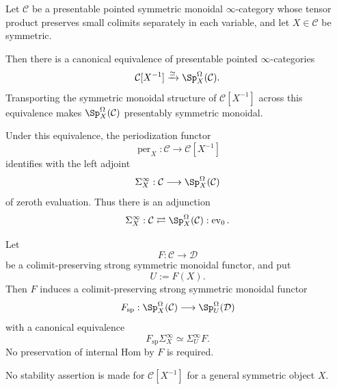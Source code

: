 \begin{proposition}
\label{prop:spectrum-model-periodization}
Let \(\mathcal C\) be a presentable pointed symmetric monoidal
\(\infty\)-category whose tensor product preserves small colimits separately
in each variable, and let \(X\in\mathcal C\) be symmetric.

Then there is a canonical equivalence of presentable pointed
\(\infty\)-categories
\[
    \mathcal C[X^{-1}]
    \xrightarrow{\simeq}
    \Sp_X^\Omega(\mathcal C).
\]
Transporting the symmetric monoidal structure of
\(\mathcal C[X^{-1}]\) across this equivalence makes
\(\Sp_X^\Omega(\mathcal C)\) presentably symmetric monoidal.

Under this equivalence, the periodization functor
\[
    \operatorname{per}_X:
    \mathcal C
    \longrightarrow
    \mathcal C[X^{-1}]
\]
identifies with the left adjoint
\[
    \Sigma_X^\infty:
    \mathcal C
    \longrightarrow
    \Sp_X^\Omega(\mathcal C)
\]
of zeroth evaluation.  Thus there is an adjunction
\[
    \Sigma_X^\infty:
    \mathcal C
    \rightleftarrows
    \Sp_X^\Omega(\mathcal C):
    \operatorname{ev}_0.
\]

Let
\[
    F:
    \mathcal C
    \longrightarrow
    \mathcal D
\]
be a colimit-preserving strong symmetric monoidal functor, and put
\[
    U:=F(X).
\]
Then \(F\) induces a colimit-preserving strong symmetric monoidal functor
\[
    F_{\mathrm{sp}}:
    \Sp_X^\Omega(\mathcal C)
    \longrightarrow
    \Sp_U^\Omega(\mathcal D)
\]
with a canonical equivalence
\[
    F_{\mathrm{sp}}\Sigma_X^\infty
    \simeq
    \Sigma_U^\infty F.
\]
No preservation of internal Hom by \(F\) is required.

No stability assertion is made for
\(\mathcal C[X^{-1}]\) for a general symmetric object \(X\).
\end{proposition}

